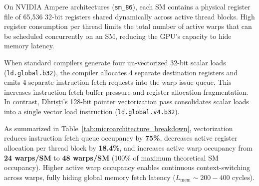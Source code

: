 \documentclass[10pt,journal,compsoc]{IEEEtran}
\begin{document}
On NVIDIA Ampere architectures (\texttt{sm\_86}), each SM contains a physical register file of 65,536 32-bit registers shared dynamically across active thread blocks. High register consumption per thread limits the total number of active warps that can be scheduled concurrently on an SM, reducing the GPU's capacity to hide memory latency.

When standard compilers generate four un-vectorized 32-bit scalar loads (\texttt{ld.global.b32}), the compiler allocates 4 separate destination registers and emits 4 separate instruction fetch requests into the warp issue queue. This increases instruction fetch buffer pressure and register allocation fragmentation. In contrast, Dhri\d{s}\d{t}i's 128-bit pointer vectorization pass consolidates scalar loads into a single vector load instruction (\texttt{ld.global.v4.b32}).

As summarized in Table~\ref{tab:microarchitecture_breakdown}, vectorization reduces instruction fetch queue occupancy by \textbf{75\%}, decreases active register allocation per thread block by \textbf{18.4\%}, and increases active warp occupancy from \textbf{24 warps/SM} to \textbf{48 warps/SM} (100\% of maximum theoretical SM occupancy). Higher active warp occupancy enables continuous context-switching across warps, fully hiding global memory fetch latency ($L_{\text{mem}} \sim 200-400\text{ cycles}$).

\begin{table}[htbp]
\centering
\caption{Microarchitectural Occupancy and Register File Allocation Comparison (Un-Vectorized Scalar vs. Dhri\d{s}\d{t}i Vectorized Execution).}
\label{tab:microarchitecture_breakdown}
\end{table}
\end{document}
